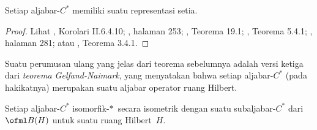 \begin{thm}\label{thm_exist_faith_rep} Setiap aljabar-$C^*$ memiliki suatu representasi setia.
\end{thm}

\begin{proof} Lihat \cite{Blackadar:2006}, Korolari II.6.4.10; \cite{Conway:1990}, halaman 253;
\cite{DoranB:1986}, Teorema 19.1; \cite{Fillmore:1996}, Teorema 5.4.1;
\cite{KadisonR:1983}, halaman 281; atau \cite{Murphy:1990}, Teorema 3.4.1. \ns
\end{proof}

Suatu perumusan ulang yang jelas dari teorema sebelumnya adalah versi ketiga dari
\emph{teorema Gelfand-Naimark}, yang menyatakan bahwa setiap aljabar-$C^*$ (pada hakikatnya)
merupakan suatu aljabar operator ruang Hilbert.

\begin{cor}\label{002973} Setiap aljabar-$C^*$
isomorfik-$*\,$ secara isometrik dengan suatu subaljabar-$C^*$ dari $\ofml B(H)$ untuk suatu ruang
Hilbert~$H$.
\end{cor}


\endinput
